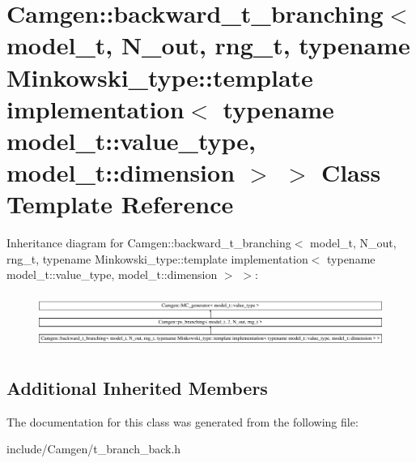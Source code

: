 \hypertarget{a00025}{\section{Camgen\-:\-:backward\-\_\-t\-\_\-branching$<$ model\-\_\-t, N\-\_\-out, rng\-\_\-t, typename Minkowski\-\_\-type\-:\-:template implementation$<$ typename model\-\_\-t\-:\-:value\-\_\-type, model\-\_\-t\-:\-:dimension $>$ $>$ Class Template Reference}
\label{a00025}
}
Inheritance diagram for Camgen\-:\-:backward\-\_\-t\-\_\-branching$<$ model\-\_\-t, N\-\_\-out, rng\-\_\-t, typename Minkowski\-\_\-type\-:\-:template implementation$<$ typename model\-\_\-t\-:\-:value\-\_\-type, model\-\_\-t\-:\-:dimension $>$ $>$\-:\begin{figure}[H]
\begin{center}
\leavevmode
\includegraphics[height=1.764706cm]{a00025}
\end{center}
\end{figure}
\subsection*{Additional Inherited Members}


The documentation for this class was generated from the following file\-:\begin{DoxyCompactItemize}
\item 
include/\-Camgen/t\-\_\-branch\-\_\-back.\-h\end{DoxyCompactItemize}
